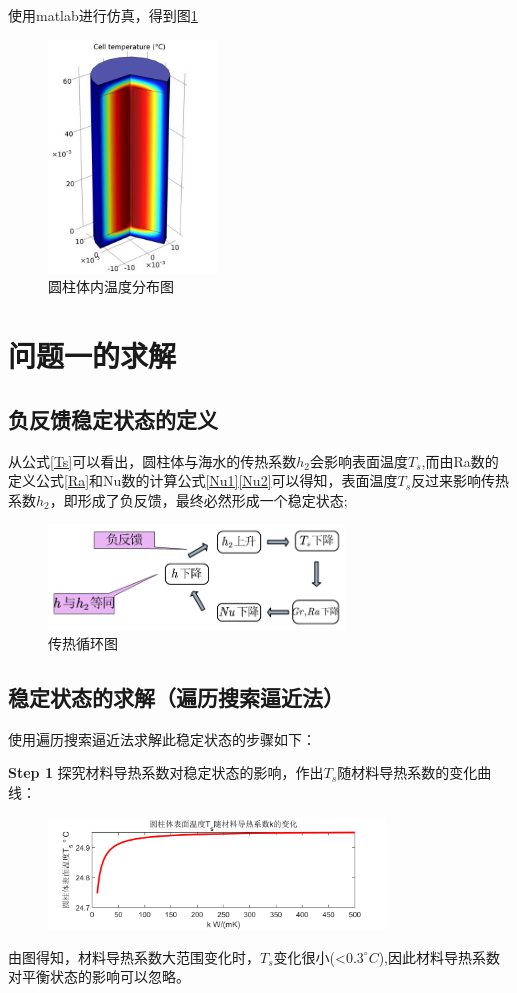 \documentclass{article}
\begin{document}
   使用matlab进行仿真，得到图\ref{wendufenbu}
   \begin{figure}[H]
   	\centering
   	\includegraphics[width=0.4\textwidth]{img/温度分布.png}
   	\caption{圆柱体内温度分布图}
   	\label{wendufenbu}
   \end{figure}
   
   
	\section{问题一的求解}
	\subsection{负反馈稳定状态的定义}
	从公式\eqref{Ts}可以看出，圆柱体与海水的传热系数$h_2$会影响表面温度$T_s$,而由Ra数的定义公式\eqref{Ra}和Nu数的计算公式\eqref{Nu1}\eqref{Nu2}可以得知，表面温度$T_s$反过来影响传热系数$h_2$，即形成了负反馈，最终必然形成一个稳定状态;
   \begin{figure}[H]
		\centering
		\includegraphics[width=0.7\textwidth]{img/循环图.png}
		\caption{传热循环图}
		\label{fig:xunhuantu}
	\end{figure}
	\subsection{稳定状态的求解（遍历搜索逼近法）}
	使用遍历搜索逼近法求解此稳定状态的步骤如下：
	
	\textbf{Step 1} 探究材料导热系数对稳定状态的影响，作出$T_s$随材料导热系数的变化曲线：
	\begin{figure}[H]
		\centering
		\includegraphics[width=0.8\textwidth]{img/表面温度随材料导热系数的变化.png}
		\label{fig:chailiao}
	\end{figure}
 	由图得知，材料导热系数大范围变化时，$T_s$变化很小(<$0.3^{\circ} C$),因此材料导热系数对平衡状态的影响可以忽略。
	
\end{document}
